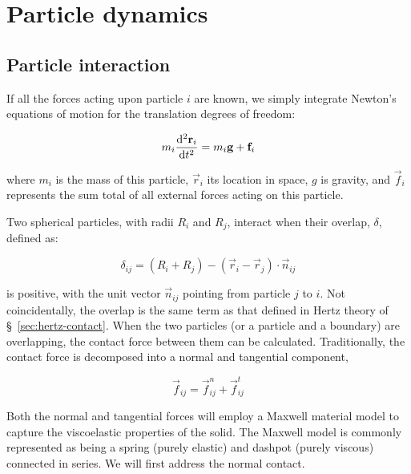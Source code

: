 \section{Particle dynamics}\label{sec:particle-dynamics}


\subsection{Particle interaction}

If all the forces acting upon particle $i$ are known, we simply integrate Newton's equations of motion for the translation degrees of freedom:

\begin{equation}\label{eq:newtons-first}
	m_i  \frac{\mathrm{d}^2{\mathbf{r}_i}}{\mathrm{d}t^2} = m_i\mathbf{g} + \mathbf{f}_i
\end{equation}



where $m_i$ is the mass of this particle, $\vec{r}_i$ its location in space, $g$ is gravity, and $\vec{f}_i$ represents the sum total of all external forces acting on this particle. %



Two spherical particles, with radii $R_i$ and $R_j$, interact when their overlap, $\delta$, defined as:

\begin{equation}
	\delta_{ij} = (R_i + R_j) - (\vec{r}_i -\vec{r}_j)\cdot \vec{n}_{ij}
\end{equation}

is positive, with the unit vector $\vec{n}_{ij}$ pointing from particle $j$ to $i$. Not coincidentally, the overlap is the same term as that defined in Hertz theory of \S~\ref{sec:hertz-contact}. When the two particles (or a particle and a boundary) are overlapping, the contact force between them can be calculated. Traditionally, the contact force is decomposed into a normal and tangential component,

\begin{equation}
	\vec{f}_{ij} = \vec{f}^n_{ij} + \vec{f}^t_{ij}
\end{equation}

Both the normal and tangential forces will employ a Maxwell material model to capture the viscoelastic properties of the solid. The Maxwell model is commonly represented as being a spring (purely elastic) and dashpot (purely viscous) connected in series. We will first address the normal contact.






